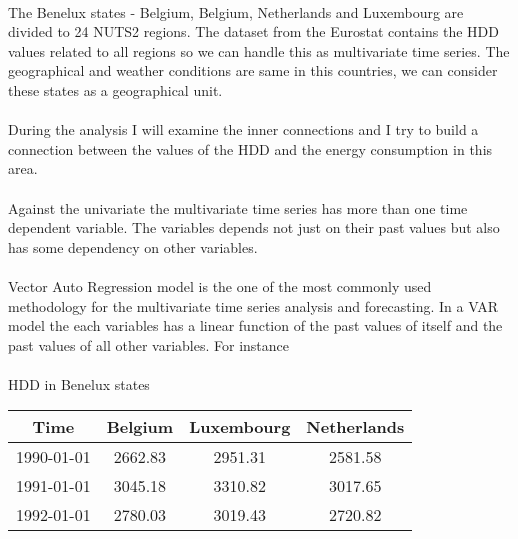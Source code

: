 \documentclass{article}
\begin{document}
\paragraph{}The Benelux states - Belgium, Belgium, Netherlands and Luxembourg are divided to 24 NUTS2 regions. The dataset from the Eurostat contains the HDD values related to all regions so we can handle this as multivariate time series. The geographical and weather conditions are same in this countries, we can consider these states as a geographical unit.
\paragraph{}During the analysis I will examine the inner connections and I try to build a connection between the values of the HDD and the energy consumption in this area. 
\paragraph{}
Against the univariate the multivariate time series has more than one time dependent variable. The variables depends not just on their past values but also has some dependency on other variables.
\paragraph{}
Vector Auto Regression model is the one of the most commonly used methodology for the multivariate time series analysis and forecasting. In a VAR model the each variables has a linear function of the past values of itself and the past values of all other variables.
For instance 
\paragraph{}
\begin{center}
HDD in Benelux states\\
\vspace{12 pt}
\begin{tabular}{|c |c|c|c| }
\hline
 Time & Belgium & Luxembourg & Netherlands \\ 
\hline
1990-01-01 & 2662.83  & 2951.31 & 2581.58\\  
\hline 
1991-01-01 & 3045.18 & 3310.82 & 3017.65 \\
\hline
1992-01-01 & 2780.03 & 3019.43 & 2720.82 \\
\hline
\end{tabular}
\end{center}
\end{document}
